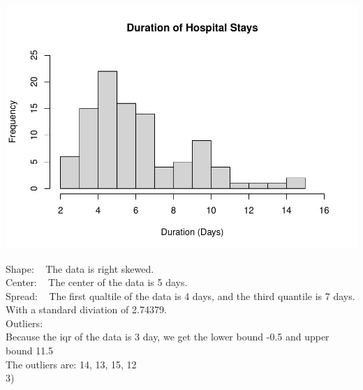 \documentclass[
]{article}
\newenvironment{Shaded}{\begin{snugshade}}{\end{snugshade}}
\newcommand{\AttributeTok}[1]{\textcolor[rgb]{0.13,0.29,0.53}{#1}}
\newcommand{\DecValTok}[1]{\textcolor[rgb]{0.00,0.00,0.81}{#1}}
\newcommand{\FunctionTok}[1]{\textcolor[rgb]{0.13,0.29,0.53}{\textbf{#1}}}
\newcommand{\NormalTok}[1]{#1}
\newcommand{\OtherTok}[1]{\textcolor[rgb]{0.56,0.35,0.01}{#1}}
\newcommand{\SpecialCharTok}[1]{\textcolor[rgb]{0.81,0.36,0.00}{\textbf{#1}}}
\newcommand{\StringTok}[1]{\textcolor[rgb]{0.31,0.60,0.02}{#1}}
\begin{document}
\includegraphics{Jiankun_Dong_HW1_files/figure-latex/unnamed-chunk-1-1.pdf}

Shape: ~ The data is right skewed.\\
Center: ~ The center of the data is 5 days.\\
Spread: ~ The first qualtile of the data is 4 days, and the third
quantile is 7 days. With a standard diviation of 2.74379.\\
Outliers:\\
Because the iqr of the data is 3 day, we get the lower bound -0.5 and
upper bound 11.5\\
The outliers are: 14, 13, 15, 12\\

3)\\

\begin{Shaded}
\end{Shaded}
\end{document}
